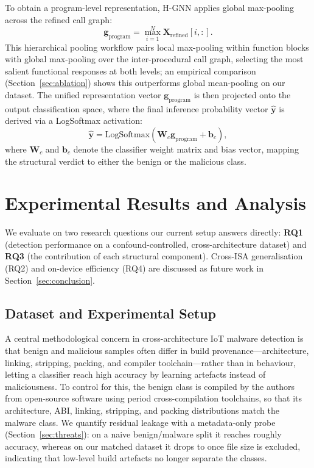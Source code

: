 \documentclass{llncs}
\begin{document}
To obtain a program-level representation, H-GNN applies global max-pooling across the refined call graph:
\begin{equation}
\mathbf{g}_{\text{program}} = \operatorname*{max}_{i=1}^{N} \mathbf{X}_{\text{refined}}[i, :].
\end{equation}
This hierarchical pooling workflow pairs local max-pooling within function blocks with global max-pooling over the inter-procedural call graph, selecting the most salient functional responses at both levels; an empirical comparison (Section~\ref{sec:ablation}) shows this outperforms global mean-pooling on our dataset. The unified representation vector $\mathbf{g}_{\text{program}}$ is then projected onto the output classification space, where the final inference probability vector $\hat{\mathbf{y}}$ is derived via a LogSoftmax activation:
\begin{equation}
\hat{\mathbf{y}} = \mathrm{LogSoftmax}\left(\mathbf{W}_{c} \mathbf{g}_{\text{program}} + \mathbf{b}_{c}\right),
\end{equation}
where $\mathbf{W}_{c}$ and $\mathbf{b}_{c}$ denote the classifier weight matrix and bias vector, mapping the structural verdict to either the benign or the malicious class.

\section{Experimental Results and Analysis}
\label{sec:experiments}

We evaluate  on two research questions our current setup
answers directly: \textbf{RQ1} (detection performance on a
confound-controlled, cross-architecture dataset) and \textbf{RQ3} (the
contribution of each structural component). Cross-ISA generalisation
(RQ2) and on-device efficiency (RQ4) are discussed as future work in
Section~\ref{sec:conclusion}.

\subsection{Dataset and Experimental Setup}
\label{sec:setup}

A central methodological concern in cross-architecture IoT malware
detection is that benign and malicious samples often differ in build
provenance---architecture, linking, stripping, packing, and compiler
toolchain---rather than in behaviour, letting a classifier reach high
accuracy by learning artefacts instead of maliciousness. To control for
this, the benign class is compiled by the authors from open-source
software using period cross-compilation toolchains, so that its
architecture, ABI, linking, stripping, and packing distributions match
the malware class. We quantify residual leakage with a metadata-only
probe (Section~\ref{sec:threats}): on a naive benign/malware split it
reaches roughly \probeOld{} accuracy, whereas on our matched dataset it
drops to \probeNew{} once file size is excluded, indicating that low-level
build artefacts no longer separate the classes.
\end{document}

